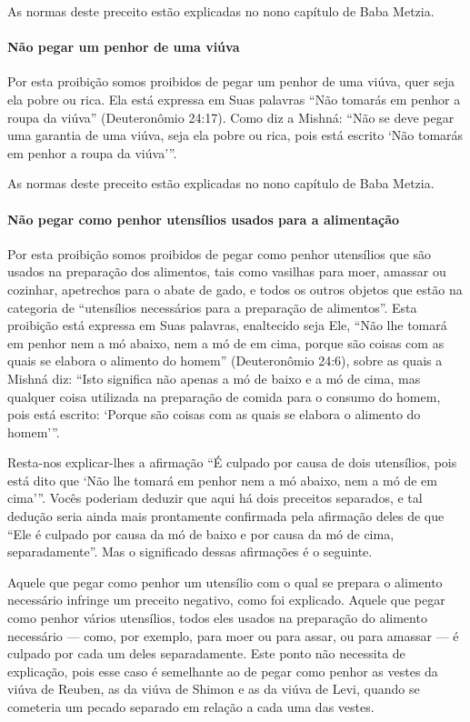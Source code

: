As normas deste preceito estão explicadas no nono capítulo de Baba Metzia.

\paragraph{Não pegar um penhor de uma viúva}

Por esta proibição somos proibidos de pegar um penhor de uma viúva,
quer seja ela pobre ou rica. Ela está expressa em Suas palavras ``Não
tomarás em penhor a roupa da viúva'' (Deuteronômio 24:17). Como diz a
Mishná: ``Não se deve pegar uma garantia de uma viúva, seja ela pobre ou
rica, pois está escrito `Não tomarás em penhor a roupa da viúva'''.

As normas deste preceito estão explicadas no nono capítulo de Baba Metzia.

\paragraph{Não pegar como penhor utensílios usados para a alimentação}

Por esta proibição somos proibidos de pegar como penhor utensílios que
são usados na preparação dos alimentos, tais como vasilhas para moer,
amassar ou cozinhar, apetrechos para o abate de gado, e todos os outros
objetos que estão na categoria de ``utensílios necessários para a
preparação de alimentos''. Esta proibição está expressa em Suas
palavras, enaltecido seja Ele, ``Não lhe tomará em penhor nem a mó
abaixo, nem a mó de em cima, porque são coisas com as quais se elabora o
alimento do homem'' (Deuteronômio 24:6), sobre as quais a Mishná diz:
``Isto significa não apenas a mó de baixo e a mó de cima, mas qualquer
coisa utilizada na preparação de comida para o consumo do homem, pois
está escrito: `Porque são coisas com as quais se elabora o alimento do
homem'''.

Resta-nos explicar-lhes a afirmação ``É culpado por causa de dois
utensílios, pois está dito que `Não lhe tomará em penhor nem a mó
abaixo, nem a mó de em cima'''. Vocês poderiam deduzir que aqui há dois
preceitos separados, e tal dedução seria ainda mais prontamente
confirmada pela afirmação deles de que ``Ele é culpado por causa da mó
de baixo e por causa da mó de cima, separadamente''. Mas o significado
dessas afirmações é o seguinte.

Aquele que pegar como penhor um utensílio com o qual se prepara o
alimento necessário infringe um preceito negativo, como foi explicado.
Aquele que pegar como penhor vários utensílios, todos eles usados na
preparação do alimento necessário --- como, por exemplo, para moer ou
para assar, ou para amassar --- é culpado por cada um deles
separadamente. Este ponto não necessita de explicação, pois esse caso é
semelhante ao de pegar como penhor as vestes da viúva de Reuben, as da
viúva de Shimon e as da viúva de Levi, quando se cometeria um pecado
separado em relação a cada uma das vestes.

